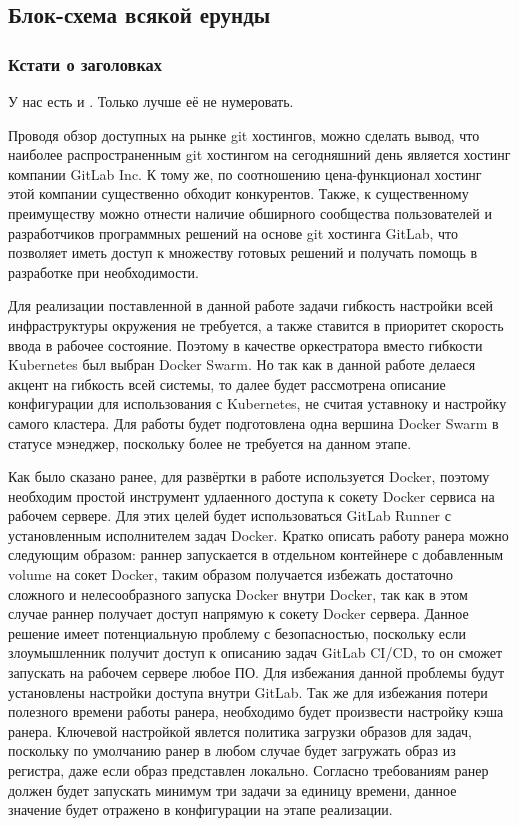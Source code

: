 \subsection{Блок-схема всякой ерунды}

\subsubsection*{Кстати о заголовках}

У нас есть и . Только лучше её не нумеровать.

Проводя обзор доступных на рынке git хостингов, можно сделать вывод, что наиболее распространенным git хостингом на сегодняшний день является хостинг компании GitLab Inc.
К тому же, по соотношению цена-функционал хостинг этой компании существенно обходит конкурентов.
Также, к существенному преимуществу можно отнести наличие обширного сообщества пользователей и разработчиков программных решений на основе git хостинга GitLab,
что позволяет иметь доступ к множеству готовых решений и получать помощь в разработке при необходимости.

Для реализации поставленной в данной работе задачи гибкость настройки всей инфраструктуры окружения не требуется, а также ставится в приоритет скорость ввода в рабочее состояние.
Поэтому в качестве оркестратора вместо гибкости Kubernetes был выбран Docker Swarm.
Но так как в данной работе делаеся акцент на гибкость всей системы, то далее будет рассмотрена описание конфигурации для использования с Kubernetes, не считая уставноку и настройку самого кластера.
Для работы будет подготовлена одна вершина Docker Swarm в статусе мэнеджер, поскольку более не требуется на данном этапе.

Как было сказано ранее, для развёртки в работе используется Docker, поэтому необходим простой инструмент удлаенного доступа к сокету Docker сервиса на рабочем сервере.
Для этих целей будет использоваться GitLab Runner с установленным исполнителем задач Docker.
Кратко описать работу ранера можно следующим образом: раннер запускается в отдельном контейнере с добавленным volume на сокет Docker,
таким образом получается избежать достаточно сложного и нелесообразного запуска Docker внутри Docker,
так как в этом случае раннер получает доступ напрямую к сокету Docker сервера.
Данное решение имеет потенциальную проблему с безопасностью, поскольку если злоумышленник получит доступ к описанию задач GitLab CI/CD, то он сможет запускать на рабочем сервере любое ПО.
Для избежания данной проблемы будут установлены настройки доступа внутри GitLab.
Так же для избежания потери полезного времени работы ранера, необходимо будет произвести настройку кэша ранера.
Ключевой настройкой явлется политика загрузки образов для задач, поскольку по умолчанию ранер в любом случае будет загружать образ из регистра, даже если образ представлен локально.
Согласно требованиям ранер должен будет запускать минимум три задачи за единицу времени, данное значение будет отражено в конфигурации на этапе реализации.

